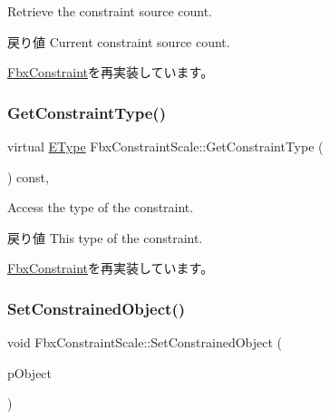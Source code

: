 Retrieve the constraint source count. \begin{DoxyReturn}{戻り値}
Current constraint source count. 
\end{DoxyReturn}


\hyperlink{class_fbx_constraint_aa702f86c6a1832ce3b4905911e66c58f}{Fbx\+Constraint}を再実装しています。

\mbox{\label{class_fbx_constraint_scale_a7eb92c352d4a4bd3c0754dd4e53fa6e4}} 
\subsubsection{\texorpdfstring{Get\+Constraint\+Type()}{GetConstraintType()}}
{\footnotesize\ttfamily virtual \hyperlink{class_fbx_constraint_a49c1634663395eab7c28856df233ec66}{E\+Type} Fbx\+Constraint\+Scale\+::\+Get\+Constraint\+Type (\begin{DoxyParamCaption}{ }\end{DoxyParamCaption}) const\hspace{0.3cm}{\ttfamily [protected]}, {\ttfamily [virtual]}}

Access the type of the constraint. \begin{DoxyReturn}{戻り値}
This type of the constraint. 
\end{DoxyReturn}


\hyperlink{class_fbx_constraint_adbeea66a1a605531a019aa6df90dc45b}{Fbx\+Constraint}を再実装しています。

\mbox{\label{class_fbx_constraint_scale_adf626a9273449dd4c74cf24f2a7bf5af}} 
\subsubsection{\texorpdfstring{Set\+Constrained\+Object()}{SetConstrainedObject()}}
{\footnotesize\ttfamily void Fbx\+Constraint\+Scale\+::\+Set\+Constrained\+Object (\begin{DoxyParamCaption}\item[{\hyperlink{class_fbx_object}{Fbx\+Object} $\ast$}]{p\+Object }\end{DoxyParamCaption})}

